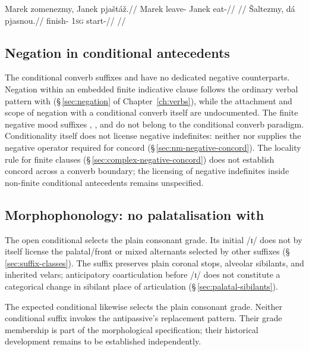 \pex \label{ex:cond-expected}
\a
\begingl
\gla Marek zomenezmy, Janek pjaštáž.//
\glb Marek leave-\ECond{} Janek eat-\Ctpl{}//
\glft {} //
\endgl
\a
\begingl
\gla Šaltezmy, dá pjasnou.//
\glb finish-\ECond{} \textsc{1sg} start-\Seq{}//
\glft {} //
\endgl
\xe

\subsection{Negation in conditional antecedents}\label{sec:cond-negation}

The conditional converb suffixes  and  have no dedicated
negative counterparts. Negation within an embedded finite indicative clause
follows the ordinary verbal pattern with 
(§\,\ref{sec:negation} of Chapter~\ref{ch:verbs}), while the attachment and
scope of negation with a conditional converb itself are undocumented. The
finite negative mood suffixes , , and  do not belong
to the conditional converb paradigm. Conditionality itself does not license
negative indefinites: neither  nor  supplies the
negative operator required for concord (§\,\ref{sec:nm-negative-concord}).
The locality rule for finite clauses (§\,\ref{sec:complex-negative-concord})
does not establish concord across a converb boundary; the licensing of
negative indefinites inside non-finite conditional antecedents remains
unspecified.

\subsection{Morphophonology: no palatalisation with }\label{sec:cond-nopala}

The open conditional  selects the plain consonant grade. Its initial
/ɪ/ does not by itself license the palatal/front or mixed alternants selected by
other suffixes (§\,\ref{sec:suffix-classes}). The suffix preserves plain
coronal stops, alveolar sibilants, and inherited velars; anticipatory
coarticulation before /ɪ/ does not constitute a categorical change in sibilant
place of articulation (§\,\ref{sec:palatal-sibilants}).

The expected conditional  likewise selects the plain consonant
grade. Neither conditional suffix invokes the antipassive's replacement
pattern. Their grade membership is part of the morphological specification;
their historical development remains to be established independently.

